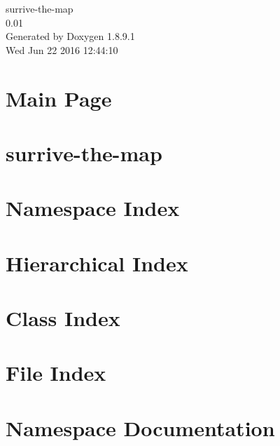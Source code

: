\documentclass[twoside]{book}
\newcommand{\+}{\discretionary{\mbox{\scriptsize$\hookleftarrow$}}{}{}}
\newcommand{\clearemptydoublepage}{%
  \newpage{\pagestyle{empty}\cleardoublepage}%
}
\begin{document}
\hypersetup{pageanchor=false,
             bookmarks=true,
             bookmarksnumbered=true,
             pdfencoding=unicode
            }
\begin{titlepage}
\vspace*{7cm}
\begin{center}%
{\Large surrive-\/the-\/map \\[1ex]\large 0.\+01 }\\
\vspace*{1cm}
{\large Generated by Doxygen 1.8.9.1}\\
\vspace*{0.5cm}
{\small Wed Jun 22 2016 12:44:10}\\
\end{center}
\end{titlepage}
\clearemptydoublepage
\tableofcontents
\clearemptydoublepage
{}
\hypersetup{pageanchor=true}

\chapter{Main Page}
\label{index}\hypertarget{index}{}
\chapter{surrive-\/the-\/map}
\label{md__c_1__users__foto__documents__git_hub_surrive-the-map__r_e_a_d_m_e}
\hypertarget{md__c_1__users__foto__documents__git_hub_surrive-the-map__r_e_a_d_m_e}{}

\chapter{Namespace Index}

\chapter{Hierarchical Index}

\chapter{Class Index}

\chapter{File Index}

\chapter{Namespace Documentation}

\end{document}
